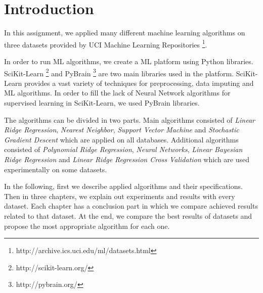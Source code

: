 \section{Introduction}
In this assignment, we applied many different machine learning algorithms on three datasets provided by UCI Machine Learning Repositories \footnote{http://archive.ics.uci.edu/ml/datasets.html}.

In order to run ML algorithms, we create a ML platform using Python libraries. SciKit-Learn \footnote{http://scikit-learn.org/} and PyBrain  \footnote{http://pybrain.org/} are two main libraries used in the platform. SciKit-Learn provides a vast variety of techniques for preprocessing, data imputing and ML algorithms. In order to fill the lack of Neural Network algorithms for supervised learning in SciKit-Learn, we used PyBrain libraries.

The algorithms can be divided in two parts. Main algorithms consisted of \textit{Linear Ridge Regression}, \textit{Nearest Neighbor}, \textit{Support Vector Machine} and \textit{Stochastic Gradient Descent} which are applied on  all databases. Additional algorithms consisted of \textit{Polynomial Ridge Regression}, \textit{Neural Networks}, \textit{Linear Bayesian Ridge Regression} and \textit{Linear Ridge Regression Cross Validation} which are used experimentally on some datasets.

In the following, first we describe applied algorithms and their specifications. Then in three chapters, we explain out experiments and results with every dataset. Each chapter has a conclusion part in which we compare achieved results related to that dataset. At the end, we compare the best results of datasets and propose the most appropriate algorithm for each one.